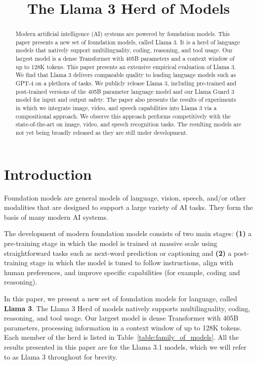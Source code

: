 \title{The Llama 3 Herd of Models}

\begin{abstract}
Modern artificial intelligence (AI) systems are powered by foundation models. This paper presents a new set of foundation models, called Llama 3. It is a herd of language models that natively support multilinguality, coding, reasoning, and tool usage. Our largest model is a dense Transformer with 405B parameters and a context window of up to 128K tokens. This paper presents an extensive empirical evaluation of Llama 3. We find that Llama 3 delivers comparable quality to leading language models such as GPT-4 on a plethora of tasks. We publicly release Llama 3, including pre-trained and post-trained versions of the 405B parameter language model and our Llama Guard 3 model for input and output safety. The paper also presents the results of experiments in which we integrate image, video, and speech capabilities into Llama 3 via a compositional approach. We observe this approach performs competitively with the state-of-the-art on image, video, and speech recognition tasks. The resulting models are not yet being broadly released as they are still under development.
\end{abstract}

\section{Introduction}
\label{section:introduction}

Foundation models are general models of language, vision, speech, and/or other modalities that are designed to support a large variety of AI tasks. They form the basis of many modern AI systems. 

The development of modern foundation models consists of two main stages: \textbf{(1)} a pre-training stage in which the model is trained at massive scale using straightforward tasks such as next-word prediction or captioning and \textbf{(2)} a post-training stage in which the model is tuned to follow instructions, align with human preferences, and improve specific capabilities (for example, coding and reasoning). 

In this paper, we present a new set of foundation models for language, called \textbf{Llama 3}. The Llama 3 Herd of models natively supports multilinguality, coding, reasoning, and tool usage. Our largest model is dense Transformer with 405B parameters, processing information in a context window of up to 128K tokens. Each member of the herd is listed in Table~\ref{table:family_of_models}.
All the results presented in this paper are for the Llama 3.1 models, which we will refer to as Llama 3 throughout for brevity.

